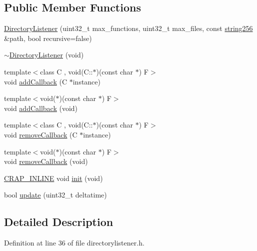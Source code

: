 \subsection*{Public Member Functions}
\begin{DoxyCompactItemize}
\item 
\hyperlink{classcrap_1_1_directory_listener_a7416eae69e009aa98153f2a2145eb876}{Directory\+Listener} (uint32\+\_\+t max\+\_\+functions, uint32\+\_\+t max\+\_\+files, const \hyperlink{namespacecrap_af674ac1cc38a09c563c68dfc3b15e554}{string256} \&path, bool recursive=false)
\item 
\hyperlink{classcrap_1_1_directory_listener_a36db341ecd19501b8ad5c4e27d898014}{$\sim$\+Directory\+Listener} (void)
\item 
{\footnotesize template$<$class C , void(\+C\+::$\ast$)(const char $\ast$) F$>$ }\\void \hyperlink{classcrap_1_1_directory_listener_ab6fece5631a3d427e3a9a261baea2836}{add\+Callback} (C $\ast$instance)
\item 
{\footnotesize template$<$void($\ast$)(const char $\ast$) F$>$ }\\void \hyperlink{classcrap_1_1_directory_listener_a7e6b1ed2e4f0577ca3a25dab3a6be3ae}{add\+Callback} (void)
\item 
{\footnotesize template$<$class C , void(\+C\+::$\ast$)(const char $\ast$) F$>$ }\\void \hyperlink{classcrap_1_1_directory_listener_ae9be484e605bbaa2baecd393f3eaff6f}{remove\+Callback} (C $\ast$instance)
\item 
{\footnotesize template$<$void($\ast$)(const char $\ast$) F$>$ }\\void \hyperlink{classcrap_1_1_directory_listener_a7dd77a5c85cee29b2c0ba6af2e7d56dc}{remove\+Callback} (void)
\item 
\hyperlink{config__x86_8h_a5a40526b8d842e7ff731509998bb0f1c}{C\+R\+A\+P\+\_\+\+I\+N\+L\+I\+N\+E} void \hyperlink{classcrap_1_1_directory_listener_ae2e30afd430186402812c7288bb12808}{init} (void)
\item 
bool \hyperlink{classcrap_1_1_directory_listener_a03a5bf5dd2dbc0f1c910c6e7f20976b4}{update} (uint32\+\_\+t deltatime)
\end{DoxyCompactItemize}


\subsection{Detailed Description}


Definition at line 36 of file directorylistener.\+h.



